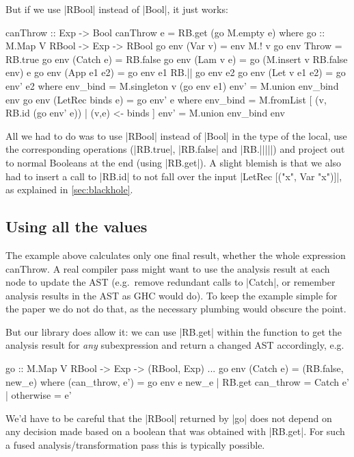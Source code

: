 \documentclass[manuscript,review,screen,acmsmall]{acmart}
\begin{document}
But if we use |RBool| instead of |Bool|, it just works:
\restorecolumns
\begin{code}
canThrow :: Exp -> Bool
canThrow e = RB.get (go M.empty e)
  where
    go :: M.Map V RBool -> Exp -> RBool
    go env (Var v)          = env M.! v
    go env Throw            = RB.true
    go env (Catch e)        = RB.false
    go env (Lam v e)        = go (M.insert v RB.false env) e
    go env (App e1 e2)      = go env e1 RB.|| go env e2
    go env (Let v e1 e2)    = go env' e2
      where
        env_bind  = M.singleton v (go env e1)
        env'      = M.union env_bind env
    go env (LetRec binds e) = go env' e
      where
        env_bind  = M.fromList [ (v, RB.id (go env' e)) | (v,e) <- binds ]
        env'      = M.union env_bind env
\end{code}
All we had to do was to use |RBool| instead of |Bool| in the type of the local, use the corresponding operations (|RB.true|, |RB.false| and |RB.|||||) and  project out to normal Booleans at the end (using |RB.get|). A slight blemish is that we also had to insert a call to |RB.id| to not fall over the input |LetRec [("x", Var "x")]|, as explained in \cref{sec:blackhole}.

\subsection{Using all the values}

The example above calculates only one final result, whether the whole expression canThrow. A real compiler pass might want to use the analysis result at each node to update the AST (e.g.\ remove redundant calls to |Catch|, or remember analysis results in the AST as GHC would do). To keep the example simple for the paper we do not do that, as the necessary plumbing would obscure the point.

But our library does allow it: we can use |RB.get| within the function to get the analysis result for \emph{any} subexpression and return a changed AST accordingly, e.g.
\restorecolumns
\begin{code}
    go :: M.Map V RBool -> Exp -> (RBool, Exp)
    ...
    go env (Catch e)        = (RB.false, new_e)
      where
        (can_throw, e') = go env e
        new_e  |  RB.get can_throw  = Catch e'
               |  otherwise         = e'
\end{code}
We'd have to be careful that the |RBool| returned by |go| does not depend on any decision made based on a boolean that was obtained with |RB.get|. For such a fused analysis/transformation pass this is typically possible.
\end{document}
